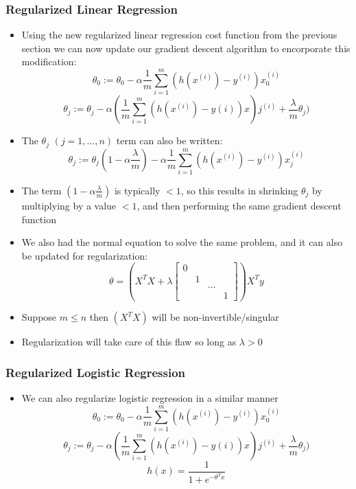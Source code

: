\subsubsection{Regularized Linear Regression}
\begin{itemize}[--]
	\item Using the new regularized linear regression cost function from the previous section we can now update our gradient descent algorithm to encorporate this modification:
		$$\theta_0 := \theta_0 - \alpha\frac{1}{m}\sum_{i=1}^{m} (h(x^{(i)})-y^{(i)})x_0^{(i)}$$
		$$\theta_j := \theta_j - \alpha ( \frac{1}{m}\sum_{i=1}^{m}(h(x^{(i)})-y{(i)})x)j^{(i)} +\frac{\lambda}{m}\theta_j )$$

	\item The $\theta_j$ $(j=1,\ldots, n)$ term can also be written:
		$$\theta_j := \theta_j (1-\alpha\frac{\lambda}{m}) - \alpha\frac{1}{m}\sum_{i=1}^{m}(h(x^{(i)}) - y^{(i)})x_j^{(i)}$$

	\item The term $(1-\alpha\frac{\lambda}{m})$ is typically $<1$, so this results in shrinking $\theta_j$ by multiplying by a value $<1$, and then performing the same gradient descent function
	\item We also had the normal equation to solve the same problem, and it can also be updated for regularization:
		$$\theta = (X^{T}X+\lambda \left[ \begin{smallmatrix}
			0 & & &\\
			& 1 & &  \\
			& & \ldots & \\
			& & & 1 
		\end{smallmatrix}\right] )X^{T}y$$

	\item Suppose $m\leq n$ then $(X^{T}X)$ will be non-invertible/singular
	\item Regularization will take care of this flaw so long as $\lambda > 0$
\end{itemize}

\subsubsection{Regularized Logistic Regression}
\begin{itemize}[--]
	\item We can also regularize logistic regression in a similar manner
		$$\theta_0 := \theta_0 - \alpha\frac{1}{m}\sum_{i=1}^{m} (h(x^{(i)})-y^{(i)})x_0^{(i)}$$
		$$\theta_j := \theta_j - \alpha ( \frac{1}{m}\sum_{i=1}^{m}(h(x^{(i)})-y{(i)})x)j^{(i)} +\frac{\lambda}{m}\theta_j )$$
		$$h(x)=\frac{1}{1+e^{-\theta^{T}x}}$$
\end{itemize}